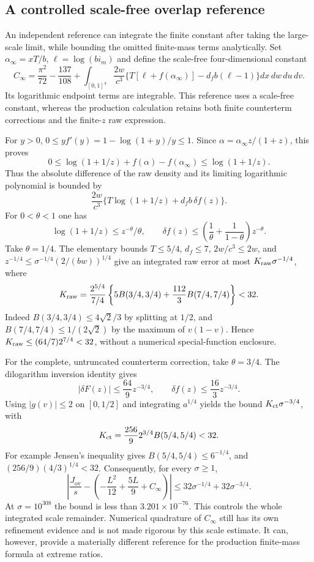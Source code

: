 \subsection{A controlled scale-free overlap reference}

An independent reference can integrate the finite constant after taking the
large-scale limit, while bounding the omitted finite-mass terms analytically.
Set $\alpha_\infty=xT/b$, $\ell=\log(bi_m)$ and define the scale-free
four-dimensional constant
\[
 C_\infty=\frac{\pi^2}{72}-\frac{137}{108}
 +\int_{[0,1]^4}\frac{2w}{c^3}
       \{T[\ell+f(\alpha_\infty)]-d_f b(\ell-1)\}
                                        dx\,dw\,du\,dv.
\]
Its logarithmic endpoint terms are integrable. This reference uses a
scale-free constant, whereas the production calculation retains both finite
counterterm corrections and the finite-$z$ raw expression.

For $y>0$, $0\le y f'(y)=1-\log(1+y)/y\le1$. Since
$\alpha=\alpha_\infty z/(1+z)$, this proves
\[
 0\le\log(1+1/z)+f(\alpha)-f(\alpha_\infty)
                                  \le\log(1+1/z).
\]
Thus the absolute difference of the raw density and its limiting
logarithmic polynomial is bounded by
\[
 \frac{2w}{c^3}\{T\log(1+1/z)+d_f b\,\delta f(z)\}.
\]
For $0<\theta<1$ one has
\[
 \log(1+1/z)\le z^{-\theta}/\theta,\qquad
 \delta f(z)\le
       \left(\frac1\theta+\frac1{1-\theta}\right)z^{-\theta}.
\]
Take $\theta=1/4$. The elementary bounds $T\le5/4$, $d_f\le7$,
$2w/c^3\le2w$, and
$z^{-1/4}\le\sigma^{-1/4}(2/(bw))^{1/4}$ give an integrated raw error
at most $K_{\rm raw}\sigma^{-1/4}$, where
\[
 K_{\rm raw}=
 \frac{2^{5/4}}{7/4}
 \left\{5B(3/4,3/4)+\frac{112}{3}B(7/4,7/4)\right\}<32.
\]
Indeed $B(3/4,3/4)\le4\sqrt2/3$ by splitting at $1/2$, and
$B(7/4,7/4)\le1/(2\sqrt2)$ by the maximum of $v(1-v)$.
Hence $K_{\rm raw}\le(64/7)2^{7/4}<32$, without a numerical special-function
enclosure.

For the complete, untruncated counterterm correction, take $\theta=3/4$.
The dilogarithm inversion identity gives
\[
 |\delta F(z)|\le\frac{64}{9}z^{-3/4},\qquad
 \delta f(z)\le\frac{16}{3}z^{-3/4}.
\]
Using $|g(v)|\le2$ on $[0,1/2]$ and integrating $a^{1/4}$ yields the
bound $K_{\rm ct}\sigma^{-3/4}$, with
\[
 K_{\rm ct}=\frac{256}{9}2^{3/4}B(5/4,5/4)<32.
\]
For example Jensen's inequality gives
$B(5/4,5/4)\le6^{-1/4}$, and
$(256/9)(4/3)^{1/4}<32$.
Consequently, for every $\sigma\ge1$,
\[
 \left|\frac{J_{\mathrm{ov}}}{s}
       -\left(-\frac{L^2}{12}+\frac{5L}{9}+C_\infty\right)\right|
 \le32\sigma^{-1/4}+32\sigma^{-3/4}.
\]
At $\sigma=10^{308}$ the bound is less than $3.201\times10^{-76}$.
This controls the whole integrated scale remainder. Numerical quadrature of
$C_\infty$ still has its own refinement evidence and is not made rigorous
by this scale estimate. It can, however, provide a materially different
reference for the production finite-mass formula at extreme ratios.
